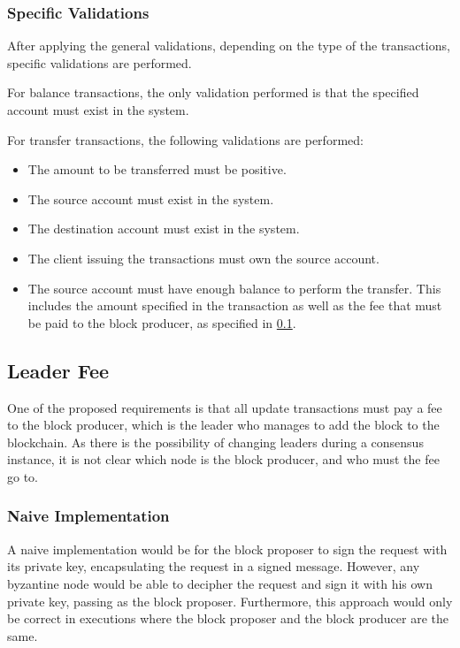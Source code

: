 \documentclass[letterpaper,twocolumn,10pt]{article}
\begin{document}
\subsubsection{Specific Validations}
\label{specific-validation}

After applying the general validations, depending on the type of the transactions, specific validations are performed.

For balance transactions, the only validation performed is that the specified account must exist in the system.

For transfer transactions, the following validations are performed:

\begin{itemize}
    \item The amount to be transferred must be positive.
    \item The source account must exist in the system.
    \item The destination account must exist in the system.
    \item The client issuing the transactions must own the source account.
    \item The source account must have enough balance to perform the transfer. This includes the amount specified in the transaction as well as the fee that must be paid to the block producer, as specified in \ref{fee}.
\end{itemize}

\subsection{Leader Fee}
\label{fee}

One of the proposed requirements is that all update transactions must pay a fee to the block producer, which is the leader who manages to add the block to the blockchain. As there is the possibility of changing leaders during a consensus instance, it is not clear which node is the block producer, and who must the fee go to.

\subsubsection{Naive Implementation}

A naive implementation would be for the block proposer to sign the request with its private key, encapsulating the request in a signed message. However, any byzantine node would be able to decipher the request and sign it with his own private key, passing as the block proposer. Furthermore, this approach would only be correct in executions where the block proposer and the block producer are the same.
\end{document}
